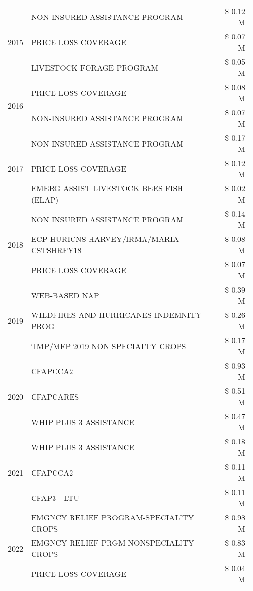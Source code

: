 \begin{tabular}{llr}
\cline{1-3}
\multirow[t]{3}{*}{2015} & NON-INSURED ASSISTANCE PROGRAM & \$ 0.12 M \\
 & PRICE LOSS COVERAGE & \$ 0.07 M \\
 & LIVESTOCK FORAGE PROGRAM & \$ 0.05 M \\
\cline{1-3}
\multirow[t]{2}{*}{2016} & PRICE LOSS COVERAGE & \$ 0.08 M \\
 & NON-INSURED ASSISTANCE PROGRAM & \$ 0.07 M \\
\cline{1-3}
\multirow[t]{3}{*}{2017} & NON-INSURED ASSISTANCE PROGRAM & \$ 0.17 M \\
 & PRICE LOSS COVERAGE & \$ 0.12 M \\
 & EMERG ASSIST LIVESTOCK BEES FISH (ELAP) & \$ 0.02 M \\
\cline{1-3}
\multirow[t]{3}{*}{2018} & NON-INSURED ASSISTANCE PROGRAM & \$ 0.14 M \\
 & ECP HURICNS HARVEY/IRMA/MARIA-CSTSHRFY18 & \$ 0.08 M \\
 & PRICE LOSS COVERAGE & \$ 0.07 M \\
\cline{1-3}
\multirow[t]{3}{*}{2019} & WEB-BASED NAP & \$ 0.39 M \\
 & WILDFIRES AND HURRICANES INDEMNITY PROG & \$ 0.26 M \\
 & TMP/MFP 2019 NON SPECIALTY CROPS & \$ 0.17 M \\
\cline{1-3}
\multirow[t]{3}{*}{2020} & CFAPCCA2 & \$ 0.93 M \\
 & CFAPCARES & \$ 0.51 M \\
 & WHIP PLUS 3 ASSISTANCE & \$ 0.47 M \\
\cline{1-3}
\multirow[t]{3}{*}{2021} & WHIP PLUS 3 ASSISTANCE & \$ 0.18 M \\
 & CFAPCCA2 & \$ 0.11 M \\
 & CFAP3 - LTU & \$ 0.11 M \\
\cline{1-3}
\multirow[t]{3}{*}{2022} & EMGNCY RELIEF PROGRAM-SPECIALITY CROPS & \$ 0.98 M \\
 & EMGNCY RELIEF PRGM-NONSPECIALITY CROPS & \$ 0.83 M \\
 & PRICE LOSS COVERAGE & \$ 0.04 M \\
\cline{1-3}
\bottomrule
\end{tabular}
